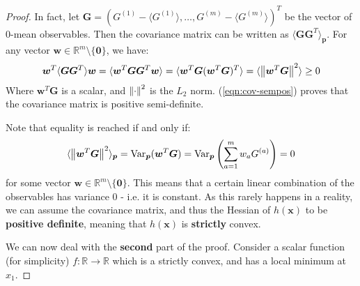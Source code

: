 \documentclass[../../main.tex]{subfiles}
\begin{document}
\begin{proof}
\medskip

In fact, let $\bm{G} = (G^{(1)} - \langle G^{(1)} \rangle, \dots, G^{(m)}- \langle G^{(m)} \rangle)^T$ be the vector of $0$-mean observables. Then the covariance matrix can be written as $\langle \bm{G} \bm{G}^T  \rangle_{\bm{p}}$. For any vector $\bm{w} \in \mathbb{R}^m \setminus \{\bm{0}\}$, we have:
\begin{align}\label{eqn:cov-sempos}
    \bm{w}^T \langle \bm{G} \bm{G}^T \rangle \bm{w} = \langle \bm{w}^T \bm{G} \bm{G}^T \bm{w} \rangle = \langle \bm{w}^T \bm{G} (\bm{w}^T \bm{G})^T \rangle = \langle \norm{\bm{w}^T \bm{G}}^2 \rangle \geq 0 
\end{align}
Where $\bm{w}^T \bm{G}$ is a scalar, and $\norm{\cdot}^2$ is the $L_2$ norm. (\ref{eqn:cov-sempos}) proves that the covariance matrix is positive semi-definite.

\medskip

Note that equality is reached if and only if:
\begin{align*}
    \langle \norm{\bm{w}^T \bm{G}}^2 \rangle_{\bm{p}} = \operatorname{Var}_{\bm{p}}(\bm{w}^T \bm{G}) = \operatorname{Var}_{\bm{p}}\left(\sum_{a=1}^m w_a G^{(a)}\right) = 0
\end{align*}
for some vector $\bm{w} \in \mathbb{R}^m \setminus \{\bm{0}\}$. This means that a certain linear combination of the observables has variance $0$ - i.e. it is constant. As this rarely happens in a reality, we can assume the covariance matrix, and thus the Hessian of $h(\bm{x})$ to be \textbf{positive definite}, meaning that $h(\bm{x})$ is \textbf{strictly} convex.  

    \medskip

    We can now deal with the \textbf{second} part of the proof. Consider a scalar function (for simplicity) $f\colon \mathbb{R} \to \mathbb{R}$ which is a strictly convex, and has a local minimum at $x_1$. 


\end{proof}
\end{document}
